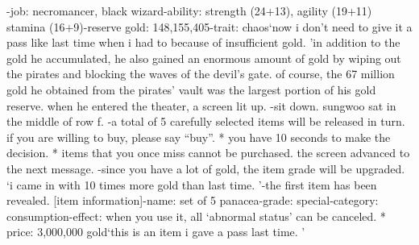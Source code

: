 -job: necromancer, black wizard-ability: strength (24+13), agility (19+11) stamina (16+9)-reserve gold: 148,155,405-trait: chaos‘now i don’t need to give it a pass like last time when i had to because of insufficient gold.
’in addition to the gold he accumulated, he also gained an enormous amount of gold by wiping out the pirates and blocking the waves of the devil’s gate.
 of course, the 67 million gold he obtained from the pirates’ vault was the largest portion of his gold reserve.
when he entered the theater, a screen lit up.
-sit down.
sungwoo sat in the middle of row f.
-a total of 5 carefully selected items will be released in turn.
 if you are willing to buy, please say “buy”.
* you have 10 seconds to make the decision.
* items that you once miss cannot be purchased.
the screen advanced to the next message.
-since you have a lot of gold, the item grade will be upgraded.
‘i came in with 10 times more gold than last time.
’-the first item has been revealed.
[item information]-name: set of 5 panacea-grade: special-category: consumption-effect: when you use it, all ‘abnormal status’ can be canceled.
* price: 3,000,000 gold‘this is an item i gave a pass last time.
’

 